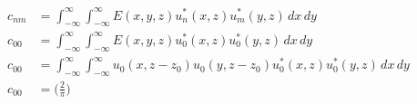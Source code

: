\begin{align}
    c_{nm} &= \int^{\infty}_{- \infty} \int^{\infty}_{- \infty}
    E(x,y,z) u_n^*(x,z)u_m^*(y,z) \,dx \,dy
\\  c_{00} &= \int^{\infty}_{- \infty} \int^{\infty}_{- \infty}
    E(x,y,z) u_0^*(x,z)u_0^*(y,z) \,dx \,dy
\\  c_{00} &= \int^{\infty}_{- \infty} \int^{\infty}_{- \infty}
    u_0(x,z-z_0)u_0(y,z-z_0) u_0^*(x,z)u_0^*(y,z) \,dx \,dy
\\  c_{00} &= \big( \frac{2}{\pi} \big)
\end{align}


